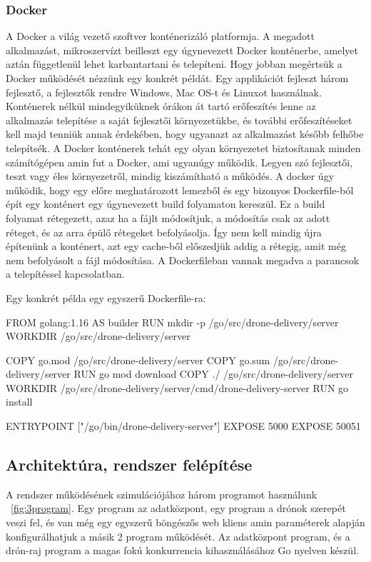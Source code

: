 \subsubsection{Docker}
A Docker a világ vezető szoftver konténerizáló platformja.
A megadott alkalmazást, mikroszervízt beilleszt egy úgynevezett Docker konténerbe, amelyet aztán függetlenül lehet karbantartani és telepíteni.
Hogy jobban megértsük a Docker működését nézzünk egy konkrét példát.
Egy applikációt fejleszt három fejlesztő, a fejlesztők rendre Windows, Mac OS-t és Linuxot használnak.
Konténerek nélkül mindegyiküknek órákon át tartó erőfeszítés lenne az alkalmazás telepítése a saját fejlesztői környezetükbe, és további erőfeszítéseket kell majd tenniük annak érdekében, hogy ugyanazt az alkalmazást később felhőbe telepítsék.
A Docker konténerek tehát egy olyan környezetet biztosítanak minden számítógépen amin fut a Docker, ami ugyanúgy működik.
Legyen szó fejlesztői, teszt vagy éles környezetről, mindig kiszámítható a működés.
A docker úgy működik, hogy egy előre meghatározott lemezből és egy bizonyos Dockerfile-ból épít egy konténert egy úgynevezett build folyamaton kereszül.
Ez a build folyamat rétegezett, azaz ha a fájlt módosítjuk, a módosítás csak az adott réteget, és az arra épülő rétegeket befolyásolja.
Így nem kell mindig újra építenünk a konténert, azt egy cache-ből előszedjük addig a rétegig, amit még nem befolyásolt a fájl módosítása.
A Dockerfileban vannak megadva a parancsok a telepítéssel kapcsolatban.
\begin{example}
    Egy konkrét példa egy egyszerű Dockerfile-ra:
    \begin{docker}
        FROM golang:1.16 AS builder
        RUN mkdir -p /go/src/drone-delivery/server
        WORKDIR /go/src/drone-delivery/server

        COPY go.mod /go/src/drone-delivery/server
        COPY go.sum /go/src/drone-delivery/server
        RUN go mod download
        COPY ./ /go/src/drone-delivery/server
        WORKDIR /go/src/drone-delivery/server/cmd/drone-delivery-server
        RUN go install

        ENTRYPOINT ["/go/bin/drone-delivery-server"]
        EXPOSE 5000
        EXPOSE 50051
    \end{docker}
\end{example}


\subsection{Architektúra, rendszer felépítése}\label{subsec:architektúra-program-felépítés}
A rendszer működésének szimulációjához három programot használunk ~\ref{fig:3program}.
Egy program az adatközpont, egy program a drónok szerepét veszi fel, és van még egy egyszerű böngészős web kliens amin paraméterek alapján konfigurálhatjuk a másik 2 program működését.
Az adatközpont program, és a drón-raj program a magas fokú konkurrencia kihasználásához Go nyelven készül.

